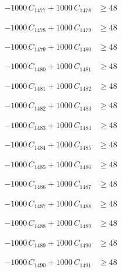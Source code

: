 \documentclass[a4paper,11pt]{article}
\begin{document}
\begin{align}
-1000\,C_{1477} + 1000\,C_{1478} &\geq 48 \nonumber
\end{align}

\begin{align}
-1000\,C_{1478} + 1000\,C_{1479} &\geq 48 \nonumber
\end{align}

\begin{align}
-1000\,C_{1479} + 1000\,C_{1480} &\geq 48 \nonumber
\end{align}

\begin{align}
-1000\,C_{1480} + 1000\,C_{1481} &\geq 48 \nonumber
\end{align}

\begin{align}
-1000\,C_{1481} + 1000\,C_{1482} &\geq 48 \nonumber
\end{align}

\begin{align}
-1000\,C_{1482} + 1000\,C_{1483} &\geq 48 \nonumber
\end{align}

\begin{align}
-1000\,C_{1483} + 1000\,C_{1484} &\geq 48 \nonumber
\end{align}

\begin{align}
-1000\,C_{1484} + 1000\,C_{1485} &\geq 48 \nonumber
\end{align}

\begin{align}
-1000\,C_{1485} + 1000\,C_{1486} &\geq 48 \nonumber
\end{align}

\begin{align}
-1000\,C_{1486} + 1000\,C_{1487} &\geq 48 \nonumber
\end{align}

\begin{align}
-1000\,C_{1487} + 1000\,C_{1488} &\geq 48 \nonumber
\end{align}

\begin{align}
-1000\,C_{1488} + 1000\,C_{1489} &\geq 48 \nonumber
\end{align}

\begin{align}
-1000\,C_{1489} + 1000\,C_{1490} &\geq 48 \nonumber
\end{align}

\begin{align}
-1000\,C_{1490} + 1000\,C_{1491} &\geq 48 \nonumber
\end{align}
\end{document}
